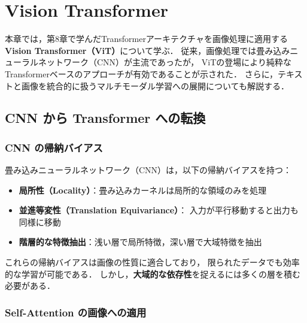 
\chapter{Vision Transformer}
\label{chap:vit}

本章では，第8章で学んだTransformerアーキテクチャを画像処理に適用する
\textbf{Vision Transformer（ViT）}について学ぶ．
従来，画像処理では畳み込みニューラルネットワーク（CNN）が主流であったが，
ViTの登場により純粋なTransformerベースのアプローチが有効であることが示された．
さらに，テキストと画像を統合的に扱うマルチモーダル学習への展開についても解説する．

\section{CNN から Transformer への転換}
\label{sec:cnn-to-transformer}

\subsection{CNN の帰納バイアス}

畳み込みニューラルネットワーク（CNN）は，以下の帰納バイアスを持つ：

\begin{itemize}
  \item \textbf{局所性（Locality）}：畳み込みカーネルは局所的な領域のみを処理
  \item \textbf{並進等変性（Translation Equivariance）}：
        入力が平行移動すると出力も同様に移動
  \item \textbf{階層的な特徴抽出}：浅い層で局所特徴，深い層で大域特徴を抽出
\end{itemize}

これらの帰納バイアスは画像の性質に適合しており，
限られたデータでも効率的な学習が可能である．
しかし，\textbf{大域的な依存性}を捉えるには多くの層を積む必要がある．

\subsection{Self-Attention の画像への適用}


